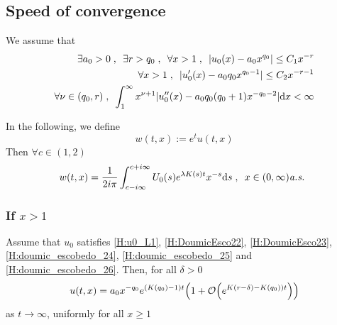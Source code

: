 \documentclass[11pt]{amsart}
\begin{document}
\subsection{Speed of convergence}

We assume that 
    \begin{align}
        \exists a_0 > 0 \; , \enspace \exists r > q_0 
        \; , \enspace
        \forall x > 1
        \; , \enspace |u_0(x) - a_0 x^{q_0}| \leq C_1 x^{-r}
        \label{H:doumic_escobedo_24}
        \\
        \forall x > 1
        \; , \enspace |u_0'(x) - a_0 q_0 x^{q_0-1}| \leq C_2 x^{-r -1} 
        \label{H:doumic_escobedo_25}
        \\
        \forall \nu \in (q_0, r) \; , \enspace
        \int_1^\infty x^{\nu + 1}  | u_0''(x) - a_0 q_0 (q_0 + 1)x^{-q_0 - 2}| \mathrm dx < \infty
        \label{H:doumic_escobedo_26}
    \end{align}
    
In the following, we define
    \begin{equation*}
        w(t,x) := e^t u(t,x)
    \end{equation*}
Then $\forall c \in (1, 2)$
    \begin{equation}
        w(t,x) = \frac{1}{2i\pi} \int_{c - i \infty}^{c + i \infty} U_0(s) e^{\lambda K(s) t} x^{-s}\mathrm ds 
    \; , \enspace x \in (0, \infty) \textit{a.s. }
    \end{equation}

\subsubsection{If $x>1$}

\begin{theorem}
Assume that $u_0$ satisfies \ref{H:u0_L1}, \ref{H:DoumicEsco22}, \eqref{H:DoumicEsco23}, \eqref{H:doumic_escobedo_24}, \eqref{H:doumic_escobedo_25} and \eqref{H:doumic_escobedo_26}. Then, for all $\delta > 0$
    \begin{equation}
    u(t,x) = a_0 x^{-q_0} e^{(K(q_0)-1)t} \Big(1 + \mathcal{O} \Big( e^{K(r-\delta) - K(q_0))t}\Big) \Big)
        \label{eq:doumic_esco_32}
    \end{equation}
    as $t \to \infty$, uniformly for all $x \geq 1$
\end{theorem}
\end{document}

